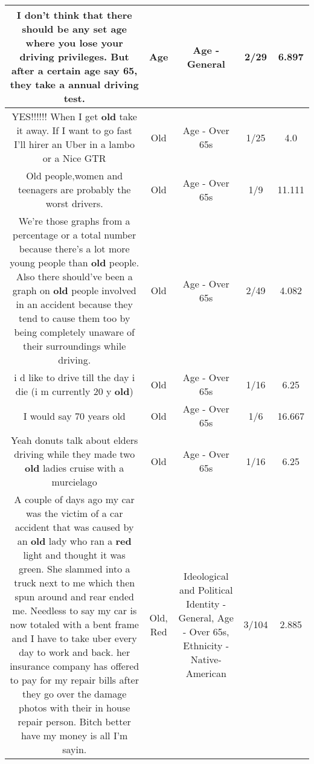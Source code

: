 \documentclass[11pt]{article}
\newlength\mylength
\begin{document}
\begin{center}
\begin{longtable}{|C{.65\mylength}|C{.30\mylength}|C{.12\mylength}|C{.12\mylength}|C{.12\mylength}|}
  \small I don't think that there should be any set \textbf{age} where you lose your driving privileges. But after a certain \textbf{age} say 65, they take a annual driving test.\normalsize   & Age & Age - General & 2/29 & 6.897 \\  \hline
  \small YES!!!!!! When I get \textbf{old} take it away.  If I want to go fast I'll hirer an Uber in a lambo or a Nice GTR\normalsize   & Old & Age - Over 65s & 1/25 & 4.0 \\  \hline
  \small Old people,women and teenagers are probably the worst drivers.\normalsize   & Old & Age - Over 65s & 1/9 & 11.111 \\  \hline
  \small We're those graphs from a percentage or a total number because there's a lot more young people than \textbf{old} people. Also  there should've been a graph on \textbf{old} people involved in an accident because they tend to cause them too by being completely unaware of their surroundings while driving.\normalsize   & Old & Age - Over 65s & 2/49 & 4.082 \\  \hline
  \small i d like to drive till the day i die (i m currently 20 y \textbf{old})\normalsize   & Old & Age - Over 65s & 1/16 & 6.25 \\  \hline
  \small I would say 70 years old\normalsize   & Old & Age - Over 65s & 1/6 & 16.667 \\  \hline
  \small Yeah donuts talk about elders driving  while they made two \textbf{old} ladies cruise with a murcielago\normalsize   & Old & Age - Over 65s & 1/16 & 6.25 \\  \hline
  \small A couple of days ago my car was the victim of a car accident that was caused by an \textbf{old} lady who ran a \textbf{r\textbf{ed}} light and thought it was green. She slammed into a truck next to me which then spun around and rear ended me. Needless to say my car is now totaled with a bent frame and I have to take uber every day to work and back. her insurance company has offered to pay for my repair bills after they go over the damage photos with their in house repair person. Bitch better have my money is all I'm sayin.\normalsize   & Old, Red &  Ideological and Political Identity - General, Age - Over 65s, Ethnicity - Native-American & 3/104 & 2.885 \\  \hline

\end{longtable}
\end{center}
\end{document}
